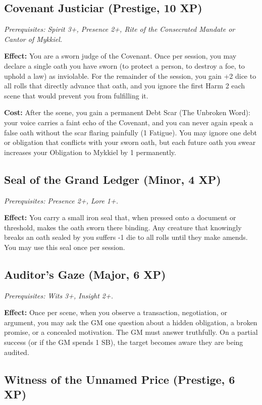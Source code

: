\documentclass{book}
\begin{document}
\subsection{Covenant Justiciar (Prestige, 10 XP)}

\emph{Prerequisites: Spirit 3+, Presence 2+, Rite of the Consecrated Mandate or Cantor of Mykkiel.}

\textbf{Effect:} You are a sworn judge of the Covenant. Once per session, you may declare a single oath you have sworn (to protect a person, to destroy a foe, to uphold a law) as inviolable. For the remainder of the session, you gain +2 dice to all rolls that directly advance that oath, and you ignore the first Harm 2 each scene that would prevent you from fulfilling it.

\textbf{Cost:} After the scene, you gain a permanent Debt Scar (The Unbroken Word): your voice carries a faint echo of the Covenant, and you can never again speak a false oath without the scar flaring painfully (1 Fatigue). You may ignore one debt or obligation that conflicts with your sworn oath, but each future oath you swear increases your Obligation to Mykkiel by 1 permanently.

\subsection{Seal of the Grand Ledger (Minor, 4 XP)}

\emph{Prerequisites: Presence 2+, Lore 1+.}

\textbf{Effect:} You carry a small iron seal that, when pressed onto a document or threshold, makes the oath sworn there binding. Any creature that knowingly breaks an oath sealed by you suffers -1 die to all rolls until they make amends. You may use this seal once per session.

\subsection{Auditor's Gaze (Major, 6 XP)}

\emph{Prerequisites: Wits 3+, Insight 2+.}

\textbf{Effect:} Once per scene, when you observe a transaction, negotiation, or argument, you may ask the GM one question about a hidden obligation, a broken promise, or a concealed motivation. The GM must answer truthfully. On a partial success (or if the GM spends 1 SB), the target becomes aware they are being audited.

\subsection{Witness of the Unnamed Price (Prestige, 6 XP)}
\end{document}
